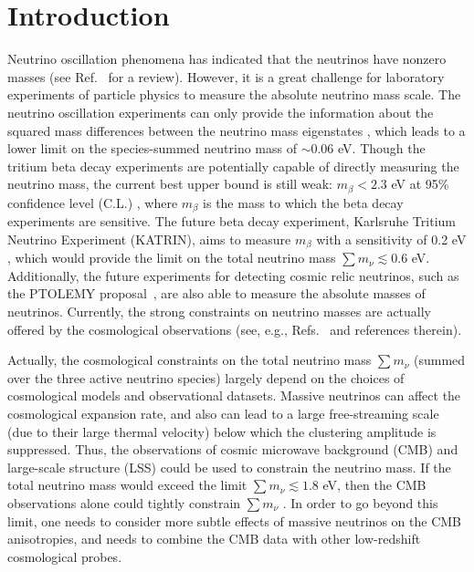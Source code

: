 \documentclass[aps,prd,nofootinbib,amsmath,amssymb,twocolumn,superscriptaddress,10pt]{revtex4}%
\begin{document}
 \maketitle
\section{Introduction}
Neutrino oscillation phenomena {has indicated} that the neutrinos have {nonzero} masses (see Ref.~\cite{Lesgourgues:2006nd} for a review). {However, it is} a great challenge for laboratory experiments of particle physics to measure the absolute neutrino mass scale. The neutrino oscillation experiments can only provide the information about the squared mass differences between the neutrino mass eigenstates \cite{PDG2015-neutrino}, which leads to a lower limit on the species-summed neutrino mass of $\sim 0.06$ eV. Though the tritium beta decay experiments are potentially capable of directly measuring the neutrino mass, the current best upper bound is still weak: $m_\beta<2.3$ eV at 95\% confidence level (C.L.) \cite{beta2,beta1}, where $m_\beta$ is the mass to which the beta decay experiments are sensitive. {The future beta decay experiment, Karlsruhe Tritium Neutrino Experiment} (KATRIN), aims to measure $m_\beta$ with a sensitivity of 0.2 eV \cite{Wolf:2008hf}, which would provide the limit {on the total neutrino mass} $\sum m_\nu\lesssim 0.6$ eV. Additionally, the future experiments for detecting cosmic relic neutrinos, such as the PTOLEMY proposal~\cite{Betts:2013uya,Zhang:2015wua,Huang:2016qmh,Zhang:2017ljh}, are also able to measure the absolute masses of neutrinos. {Currently, the strong constraints on neutrino masses are actually offered by the cosmological observations} (see, e.g., Refs.~\cite{Ade:2013zuv,Ade:2015xua} and references therein).

Actually, the cosmological constraints on the total neutrino mass $\sum m_\nu$ (summed over the three active neutrino species) largely depend on the choices of cosmological models and observational datasets. Massive neutrinos can affect the cosmological expansion rate, and also can lead to a large free-streaming scale (due to their large thermal velocity) below which the clustering amplitude is suppressed. Thus, the observations of cosmic microwave background (CMB) and large-scale structure (LSS) could be used to constrain the neutrino mass. If the total neutrino mass would exceed the limit $\sum m_\nu \lesssim 1.8$ eV, then the CMB observations alone could tightly constrain $\sum m_\nu$ \cite{Dodelson:1995es,Ichikawa:2004zi}. In order to go beyond this limit, one needs to consider more subtle effects of massive neutrinos on the CMB anisotropies, and needs to combine the CMB data with other low-redshift cosmological probes.
\end{document}

